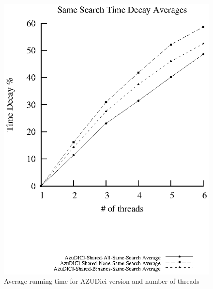 \begin{figure}[htp]
  \centering
  \includegraphics[scale=1]{averageSStime}
  \caption{Average running time for AZUDici version and number of
    threads}
  \label{fig:ssruntimes}
\end{figure}

